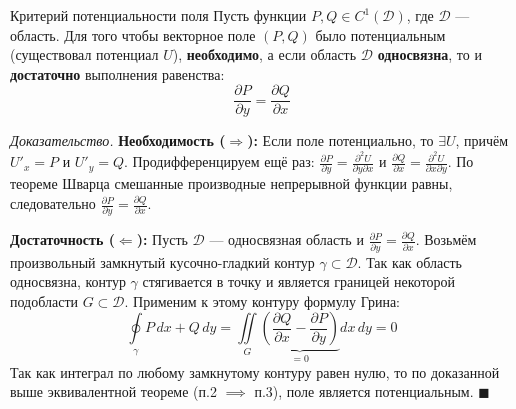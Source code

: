 \documentclass[12pt,a4paper]{article}
\newenvironment{Proof}[1][Доказательство]{\vspace{0.5em}\noindent\textit{#1.}\hspace{0.5em}\ignorespaces}{\hfill$\blacksquare$\vspace{1em}}
\begin{document}
\begin{Theorem}{Критерий потенциальности поля}{}
Пусть функции $P, Q \in C^1(\mathscr{D})$, где $\mathscr{D}$ — область. 
Для того чтобы векторное поле $(P, Q)$ было потенциальным (существовал потенциал $U$), \textbf{необходимо}, а если область $\mathscr{D}$ \textbf{односвязна}, то и \textbf{достаточно} выполнения равенства:
$$ \frac{\partial P}{\partial y} = \frac{\partial Q}{\partial x} $$
\end{Theorem}

\begin{Proof}
\textbf{Необходимость ($\Rightarrow$):} Если поле потенциально, то $\exists U$, причём $U'_x = P$ и $U'_y = Q$. Продифференцируем ещё раз: $\frac{\partial P}{\partial y} = \frac{\partial^2 U}{\partial y \partial x}$ и $\frac{\partial Q}{\partial x} = \frac{\partial^2 U}{\partial x \partial y}$. По теореме Шварца смешанные производные непрерывной функции равны, следовательно $\frac{\partial P}{\partial y} = \frac{\partial Q}{\partial x}$.

\textbf{Достаточность ($\Leftarrow$):} Пусть $\mathscr{D}$ — односвязная область и $\frac{\partial P}{\partial y} = \frac{\partial Q}{\partial x}$. 
Возьмём произвольный замкнутый кусочно-гладкий контур $\gamma \subset \mathscr{D}$. Так как область односвязна, контур $\gamma$ стягивается в точку и является границей некоторой подобласти $G \subset \mathscr{D}$. 
Применим к этому контуру формулу Грина:
$$ \oint\limits_\gamma P \, dx + Q \, dy = \iint\limits_{G} \underbrace{\left( \frac{\partial Q}{\partial x} - \frac{\partial P}{\partial y} \right)}_{= 0} dx \, dy = 0 $$
Так как интеграл по любому замкнутому контуру равен нулю, то по доказанной выше эквивалентной теореме (п.2 $\implies$ п.3), поле является потенциальным.
\end{Proof}
\end{document}
